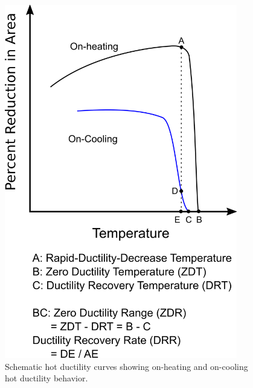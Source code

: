 \begin{figure}
    \centering
    \includegraphics[width=4in]{figures/hot-ductility/schematic-hot-ducility-curves.png}
    \caption{Schematic hot ductility curves showing on-heating and on-cooling hot ductility behavior.}
    \label{fig:schematic-hot-ductility-curves}
\end{figure}

